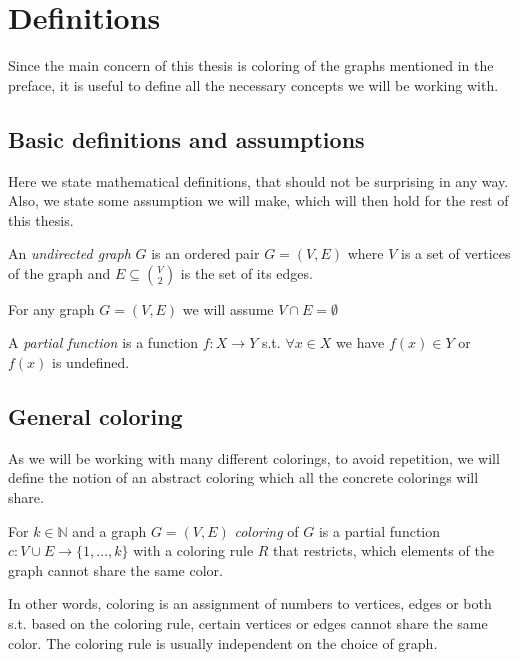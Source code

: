 \chapter{Definitions}

Since the main concern of this thesis is coloring of the graphs mentioned in the preface, it is useful to define all the necessary concepts we will be working with.

\section{Basic definitions and assumptions}

Here we state mathematical definitions, that should not be surprising in any way. Also, we state some assumption we will make, which will then hold for the rest of this thesis.

\begin{definition}
    An \textit{undirected graph} $G$ is an ordered pair $G=(V,E)$ where $V$ is a set of vertices of the graph and $E \subseteq \binom{V}{2}$ is the set of its edges. 
\end{definition}

\begin{assumption}
    For any graph $G=(V,E)$ we will assume $V \cap E = \emptyset$ 
\end{assumption}

\begin{definition}
    A \textit{partial function} is a function $f:X \rightarrow Y$ s.t. $\forall x \in X$ we have $f(x) \in Y$ or $f(x)$ is undefined.
\end{definition}

\section{General coloring}

As we will be working with many different colorings, to avoid repetition, we will define the notion of an abstract coloring which all the concrete colorings will share.

\begin{definition}
    For $k \in \mathbb{N}$ and a graph $G=(V,E)$ \textit{coloring} of $G$ is a partial function $c: V \cup E \rightarrow \{1,\ldots,k\}$ with a coloring rule $R$ that restricts, which elements of the graph cannot share the same color.
\end{definition}

In other words, coloring is an assignment of numbers to vertices, edges or both s.t. based on the coloring rule, certain vertices or edges cannot share the same color. The coloring rule is usually independent on the choice of graph.

